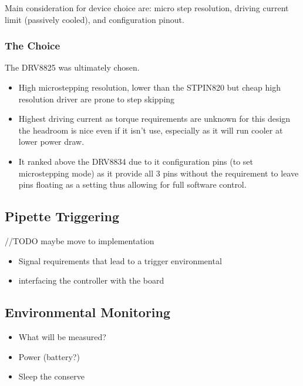 Main consideration for device choice are: micro step resolution, driving current limit (passively cooled), and configuration pinout.

\subsubsection*{The Choice}
The DRV8825 was ultimately chosen.
\begin{itemize}
    \item High microstepping resolution, lower than the STPIN820 but cheap high resolution driver are prone to step skipping \cite{step_book}
    \item Highest driving current as torque requirements are unknown for this design the headroom is nice even if it isn't use, especially as it will run cooler at lower power draw.
    \item It ranked above the DRV8834 due to it configuration pins (to set microstepping mode) as it provide all 3 pins without the requirement to leave pins floating as a setting thus allowing for full software control.
\end{itemize}

\subsection{Pipette Triggering}

//TODO maybe move to implementation
\begin{itemize}
    \item Signal requirements that lead to a trigger environmental
    \item interfacing the controller with the board
\end{itemize}

\subsection{Environmental Monitoring}
\begin{itemize} 
    \item What will be measured?
    \item Power (battery?)
    \item Sleep the conserve
\end{itemize}
